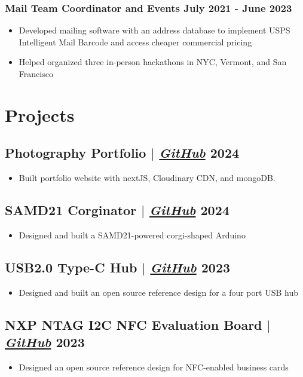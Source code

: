\documentclass[11pt]{article}
\begin{document}
\subsubsection{Mail Team Coordinator and Events \hfill July 2021 - June 2023}
\begin{itemize}
    \item Developed mailing software with an address database to implement USPS Intelligent Mail Barcode and access cheaper commercial pricing 
    \item Helped organized three in-person hackathons in NYC, Vermont, and San Francisco
\end{itemize}

\section{Projects}
\subsection{Photography Portfolio {\normalfont $|$ \href{https://github.com/Hugoyhu/Image-Gallery-v2}{\textit{GitHub}}} \hfill 2024}
\begin{itemize}
    \item Built portfolio website with nextJS, Cloudinary CDN, and mongoDB.
\end{itemize}
\subsection{SAMD21 Corginator {\normalfont $|$ \href{https://github.com/Hugoyhu/SAMD21-Corginator}{\textit{GitHub}}} \hfill 2024}
\begin{itemize}
    \item Designed and built a SAMD21-powered corgi-shaped Arduino
\end{itemize}

\subsection{USB2.0 Type-C Hub {\normalfont $|$ \href{https://github.com/Hugoyhu/SL2.1A-Type-C-Hub}{\textit{GitHub}}} \hfill 2023}
\begin{itemize}
    \item Designed and built an open source reference design for a four port USB hub
\end{itemize}

\subsection{NXP NTAG I2C NFC Evaluation Board {\normalfont $|$ \href{https://github.com/Hugoyhu/NTAG-I2C-Eval-Board}{\textit{GitHub}}} \hfill 2023}
\begin{itemize}
    \item Designed an open source reference design for NFC-enabled business cards
\end{itemize}
\end{document}
